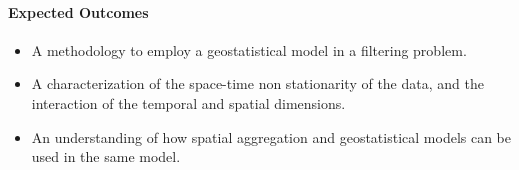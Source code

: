 \paragraph{Expected Outcomes}

\begin{itemize}
  \item A methodology to employ a geostatistical model in a filtering problem.
  \item A characterization of the space-time non stationarity of the data, and the interaction of the temporal and spatial dimensions.
  \item An understanding of how spatial aggregation and geostatistical models can be used in the same model. 
\end{itemize}
